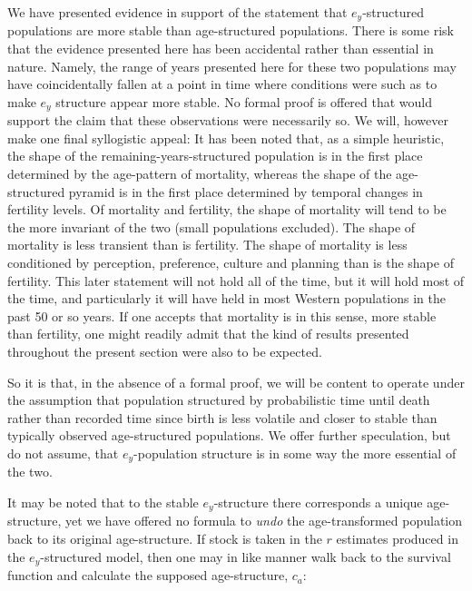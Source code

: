 We have presented evidence in support of the statement that $e_y$-structured
populations are more stable than age-structured populations. There is some
risk that the evidence presented here has been accidental rather
than essential in nature. Namely, the range of years presented here for these
two populations may have coincidentally fallen at a point in time where
conditions were such as to make $e_y$ structure appear more stable. No formal
proof is offered that would support the claim that these observations were
necessarily so. We will, however make one final syllogistic appeal: It has been
noted that, as a simple heuristic, the shape of the remaining-years-structured
population is in the first place determined by the age-pattern of mortality,
whereas the shape of the age-structured pyramid is in the first place
determined by temporal changes in fertility levels. Of mortality and
fertility, the shape of mortality will tend to be the more invariant of the two
(small populations excluded). The shape of mortality is less transient than is
fertility. The shape of mortality is less conditioned by perception, preference, 
culture and planning than is the shape of fertility. This later statement will
not hold all of the time, but it will hold most of the time, and particularly it
will have held in most Western populations in the past 50 or so years. If one
accepts that mortality is in this sense, more stable than fertility, one might
readily admit that the kind of results presented throughout the present section
were also to be expected. 

So it is that, in the absence of a formal proof, we
will be content to operate under the assumption that population structured by 
probabilistic time until death rather than recorded time since birth is less
volatile and closer to stable than typically observed age-structured
populations. We offer further speculation, but do not assume, that $e_y$-population 
structure is in some way the more essential of the two.

It may be noted that to the stable $e_y$-structure there corresponds a unique
age-structure, yet we have offered no formula to \textit{undo} the
age-transformed population back to its original age-structure. If stock 
is taken in the $r$ estimates produced in the $e_y$-structured model, 
then one may in like manner walk back to the
survival function and calculate the supposed age-structure, $c_a$:

